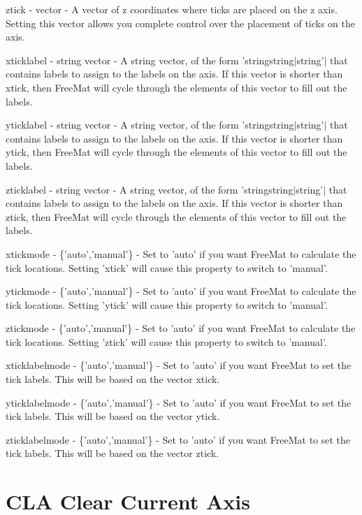 \begin{DoxyItemize}
\item {\ttfamily ztick} -\/ {\ttfamily vector} -\/ A vector of z coordinates where ticks are placed on the z axis. Setting this vector allows you complete control over the placement of ticks on the axis.  
\item {\ttfamily xticklabel} -\/ {\ttfamily string vector} -\/ A string vector, of the form {\ttfamily 'string}string$|$string'$|$ that contains labels to assign to the labels on the axis. If this vector is shorter than {\ttfamily xtick}, then Free\-Mat will cycle through the elements of this vector to fill out the labels.  
\item {\ttfamily yticklabel} -\/ {\ttfamily string vector} -\/ A string vector, of the form {\ttfamily 'string}string$|$string'$|$ that contains labels to assign to the labels on the axis. If this vector is shorter than {\ttfamily ytick}, then Free\-Mat will cycle through the elements of this vector to fill out the labels.  
\item {\ttfamily zticklabel} -\/ {\ttfamily string vector} -\/ A string vector, of the form {\ttfamily 'string}string$|$string'$|$ that contains labels to assign to the labels on the axis. If this vector is shorter than {\ttfamily ztick}, then Free\-Mat will cycle through the elements of this vector to fill out the labels.  
\item {\ttfamily xtickmode} -\/ {\ttfamily \{'auto','manual'\}} -\/ Set to {\ttfamily 'auto'} if you want Free\-Mat to calculate the tick locations. Setting {\ttfamily 'xtick'} will cause this property to switch to {\ttfamily 'manual'}.  
\item {\ttfamily ytickmode} -\/ {\ttfamily \{'auto','manual'\}} -\/ Set to {\ttfamily 'auto'} if you want Free\-Mat to calculate the tick locations. Setting {\ttfamily 'ytick'} will cause this property to switch to {\ttfamily 'manual'}.  
\item {\ttfamily ztickmode} -\/ {\ttfamily \{'auto','manual'\}} -\/ Set to {\ttfamily 'auto'} if you want Free\-Mat to calculate the tick locations. Setting {\ttfamily 'ztick'} will cause this property to switch to {\ttfamily 'manual'}.  
\item {\ttfamily xticklabelmode} -\/ {\ttfamily \{'auto','manual'\}} -\/ Set to {\ttfamily 'auto'} if you want Free\-Mat to set the tick labels. This will be based on the vector {\ttfamily xtick}.  
\item {\ttfamily yticklabelmode} -\/ {\ttfamily \{'auto','manual'\}} -\/ Set to {\ttfamily 'auto'} if you want Free\-Mat to set the tick labels. This will be based on the vector {\ttfamily ytick}.  
\item {\ttfamily zticklabelmode} -\/ {\ttfamily \{'auto','manual'\}} -\/ Set to {\ttfamily 'auto'} if you want Free\-Mat to set the tick labels. This will be based on the vector {\ttfamily ztick}.  
\end{DoxyItemize}\hypertarget{handle_cla}{}\section{C\-L\-A Clear Current Axis}\label{handle_cla}
